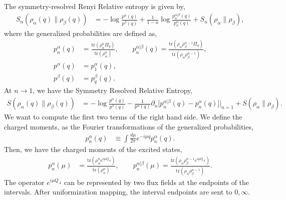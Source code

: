 \documentclass[11pt]{article}
\newcommand{\p}{\partial}
\begin{document}
The symmetry-resolved Renyi Relative entropy is given by,
\begin{align}
    S_n(\rho_\alpha(q)\| \rho_\beta(q)) &= -\log\frac{p^\alpha(q)}{p^\beta(q)} + \frac{1}{1-n} \log \frac{p_n^{\alpha|\beta}(q)}{p_n^\alpha(q)} + S_n(\rho_\alpha\|\rho_\beta),
\end{align}
where the generalized probabilities are defined as,
\begin{align}
    p_n^\alpha(q) &= \frac{\text{tr}(\rho_\alpha^n\Pi_q)}{\text{tr}(\rho_\alpha^n)}, \qquad p_n^{\alpha|\beta}(q) = \frac{\text{tr}(\rho_\alpha\rho_\beta^{n-1}\Pi_q)}{\text{tr}(\rho_\alpha\rho_\beta^{n-1})},\\
    p^\alpha(q) &= p_1^\alpha(q),\\
    p^\beta(q) &= p_q^\beta(q).
\end{align}
At $n\to 1$, we have the Symmetry Resolved Relative Entropy,
\begin{align}
    S(\rho_\alpha(q)\|\rho_\beta(q)) &= -\log \frac{p^\alpha(q)}{p^\beta(q)}- \frac{1}{p^\alpha(q)}\p_n \big[p_n^{\alpha|\beta}(q ) - p_n^\alpha(q)\big]\big|_{n=1} + S(\rho_\alpha \|\rho_\beta). 
\end{align}
We want to compute the first two terms of the right hand side. 
We define the charged moments,
as the Fourier transformations of the generalized probabilities,
\begin{align}
    p_n^\alpha(q)&\equiv \int \frac{d\mu}{2\pi} e^{-i\mu q} p_n^\alpha(q).
\end{align}
Then, we have the charged moments of the excited states,
\begin{align}
    p_n^\alpha(\mu) &= \frac{\text{tr}(\rho_\alpha^ne^{i\mu Q_A})}{\text{tr}(\rho_\alpha^n)}, \qquad p_n^{\alpha|\beta}(\mu) = \frac{\text{tr}(\rho_\alpha\rho_\beta^{n-1}e^{i\mu Q_A})}{\text{tr}(\rho_\alpha\rho_\beta^{n-1})}.
\end{align}
The operator $e^{i\mu Q_A}$ can be represented by two flux fields at the endpoints of the intervals. After uniformization mapping, the interval endpoints are sent to $0,\infty$. 
\end{document}
